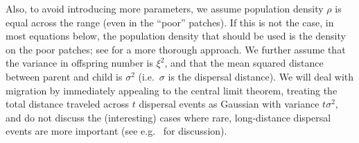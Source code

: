 \documentclass{article}
\newcommand{\linelabel}[1]{}
\newcommand{\citep}[1]{\cite{#1}}
\newcommand{\citet}[1]{\cite{#1}}
\newcommand{\gc}[1]{{\it\color{green}(#1)} }
\newcommand{\plr}[1]{{\it\color{blue}(#1)}}
\begin{document}
Also, to avoid introducing more parameters,
we assume population density $\rho$ is equal across the range (even in the ``poor'' patches).
If this is not the case, in most equations below, the population density that should be used is the density
on the poor patches; see \citet{lenormand2002limits} for a more thorough approach.
We further assume that the variance in offspring number is $\xi^2$, 
and that the mean squared distance between parent and child is $\sigma^2$
(i.e.\ $\sigma$ is the dispersal distance). 
We will deal with migration by immediately appealing to the central limit theorem,
treating the total distance traveled across $t$  dispersal events as Gaussian with variance $t \sigma^2$,
and do not discuss the (interesting) cases where rare, long-distance dispersal events
are more important (see e.g.\ \citet{levin2003ecology,ralph2010parallel,hallatschek2014acceleration} for discussion).  \linelabel{rr:longtailed}
\end{document}
